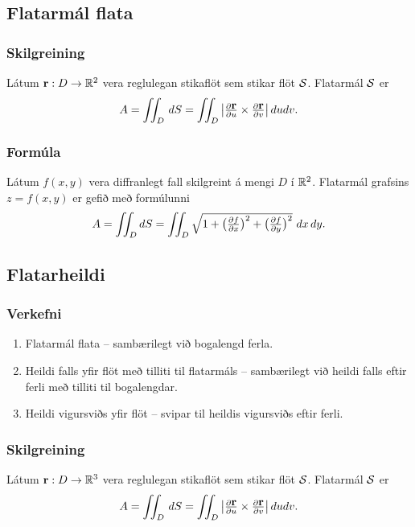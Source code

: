 \subsection{Flatarmál flata} 

\subsubsection{Skilgreining  \rtask{}}
  Látum $\mbox{${\bf r}$}:D\rightarrow {\mathbb R}^2$ vera
reglulegan stikaflöt sem stikar flöt $\cal S$.  Flatarmál $\cal S$ er  
$$ A=\int\!\!\!\int_D\,dS=\int\!\!\!\int_D \big|{\textstyle\frac{\partial \mbox{${\bf r}$}}{\partial u}
\times\frac{\partial \mbox{${\bf r}$}}{\partial v}}\big|\,dudv.$$



\subsubsection{Formúla  \rtask{}}
Látum $f(x,y)$ vera diffranlegt fall skilgreint á
mengi $D$ í ${\mathbb R}^2$.  Flatarmál grafsins $z=f(x,y)$ er gefið með
formúlunni 
$$A=\int\!\!\!\int_D dS=\int\!\!\!\int_D {\textstyle\sqrt{1+
\big(\frac{\partial f}{\partial x}\big)^2+
\big(\frac{\partial f}{\partial y}\big)^2}}\,\,dx\,dy.$$
   



\subsection{Flatarheildi} 

\subsubsection{Verkefni  \rtask{}}
\begin {enumerate}
 \item Flatarmál flata -- sambærilegt við bogalengd ferla.  
\item Heildi falls yfir flöt með tilliti til flatarmáls -- sambærilegt við heildi falls eftir ferli með tilliti til bogalengdar.
\item Heildi vigursviðs yfir flöt -- svipar til heildis vigursviðs eftir ferli. 
 \end {enumerate}


\subsubsection{Skilgreining \rtask{}}
  Látum $\mbox{${\bf r}$}:D\rightarrow {\mathbb R}^3$ vera
reglulegan stikaflöt sem stikar flöt $\cal S$.  Flatarmál $\cal S$ er  
$$ A=\int\!\!\!\int_D\,dS=\int\!\!\!\int_D \big|{\textstyle\frac{\partial \mbox{${\bf r}$}}{\partial u}
\times\frac{\partial \mbox{${\bf r}$}}{\partial v}}\big|\,dudv.$$




